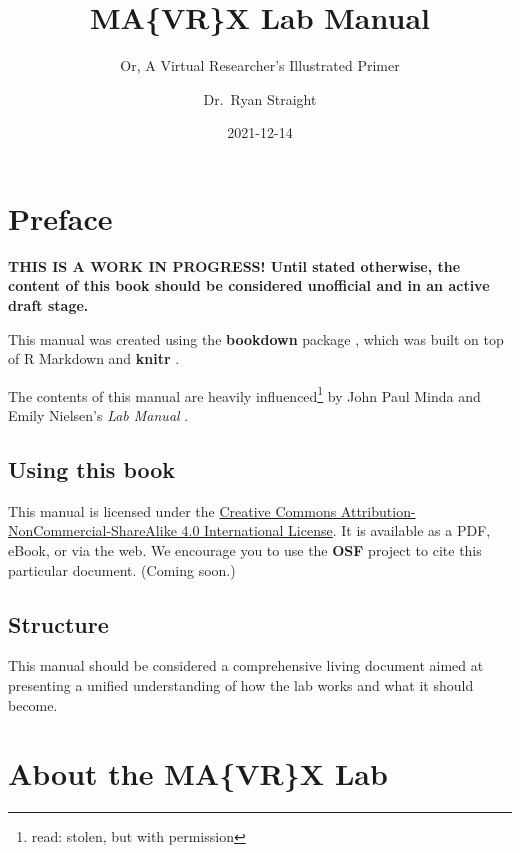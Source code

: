 \documentclass[
]{book}
\title{MA\{VR\}X Lab Manual}
\subtitle{Or, A Virtual Researcher's Illustrated Primer}
\author{Dr.~Ryan Straight}
\date{2021-12-14}
\begin{document}
\maketitle

{
\hypersetup{linkcolor=}
\setcounter{tocdepth}{1}
\tableofcontents
}
\listoffigures
\listoftables
\hypertarget{preface}{%
\chapter*{Preface}\label{preface}}

\textbf{THIS IS A WORK IN PROGRESS! Until stated otherwise, the content of this book should be considered unofficial and in an active draft stage.}

This manual was created using the \textbf{bookdown} package \citep{R-bookdown}, which was built on top of R Markdown and \textbf{knitr} \citep{xie2015}.

The contents of this manual are heavily influenced\footnote{read: stolen, but with permission} by John Paul Minda and Emily Nielsen's \emph{Lab Manual} \citeyearpar{Minda_Nielsen_2018}.

\hypertarget{using-this-book}{%
\section*{Using this book}\label{using-this-book}}

This manual is licensed under the \href{http://creativecommons.org/licenses/by-nc-sa/4.0/}{Creative Commons Attribution-NonCommercial-ShareAlike 4.0 International License}. It is available as a PDF, eBook, or via the web. We encourage you to use the \textbf{OSF} project to cite this particular document. (Coming soon.)

\hypertarget{structure}{%
\section*{Structure}\label{structure}}

This manual should be considered a comprehensive living document aimed at presenting a unified understanding of how the lab works and what it should become.

\hypertarget{about-the-mavrx-lab}{%
\chapter*{About the MA\{VR\}X Lab}\label{about-the-mavrx-lab}}
\end{document}
